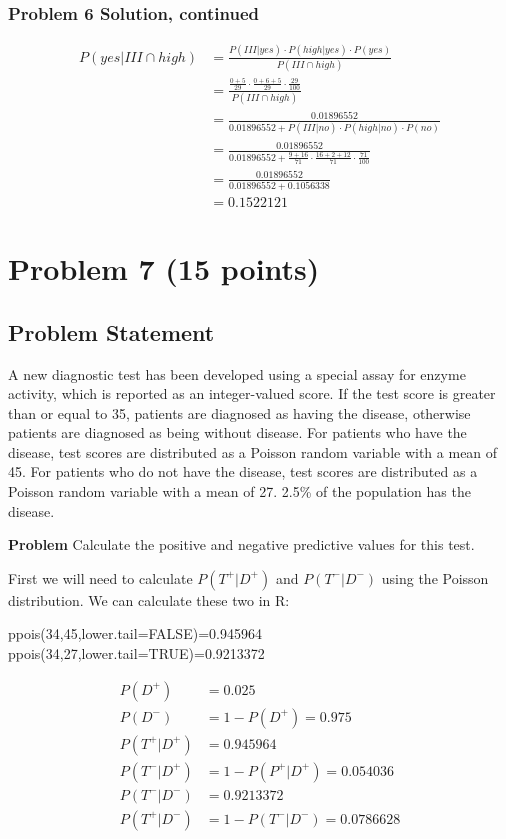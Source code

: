 \documentclass[12pt]{article}
\theoremstyle{definition}
\begin{document}
\subsubsection*{Problem 6 Solution, continued}
\begin{align*}
P(yes|III \cap high) &= \frac{P(III|yes) \cdot P(high|yes) \cdot P(yes)}{P(III \cap high)}\\
&= \frac{\frac{0 + 5}{29} \cdot \frac{0 + 6 + 5}{29} \cdot \frac{29}{100}}{P(III \cap high)}\\
&= \frac{0.01896552}{0.01896552 + P(III|no) \cdot P(high|no) \cdot P(no)}\\
&= \frac{0.01896552}{0.01896552 + \frac{9 + 16}{71} \cdot \frac{16 + 2 + 12}{71} \cdot \frac{71}{100}}\\
&= \frac{0.01896552}{0.01896552+ 0.1056338}\\
&= 0.1522121
\end{align*}







\newpage
\section*{Problem 7 (15 points)}

\subsection*{Problem Statement}

A new diagnostic test has been developed using a special assay for enzyme activity, which is reported as an integer-valued score. If the test score is greater than or equal to 35, patients are diagnosed as having the disease, otherwise patients are diagnosed as being without disease. For patients who have the disease, test scores are distributed as a Poisson random variable with a mean of 45. For patients who do not have the disease, test scores are distributed as a Poisson random variable with a mean of 27. 2.5\% of the population has the disease.

\bigskip
\noindent
{\bf Problem} Calculate the positive and negative predictive values for this test.

First we will need to calculate $P(T^+|D^+)$ and $P(T^-|D^-)$ using the Poisson distribution. We can calculate these two in R:
\begin{verbatim*}
ppois(34,45,lower.tail=FALSE)=0.945964
ppois(34,27,lower.tail=TRUE)=0.9213372
\end{verbatim*}
\begin{align*}
P(D^+) &= 0.025\\
P(D^-) &= 1 - P(D^+) = 0.975\\
P(T^+|D^+) &= 0.945964\\
P(T^-|D^+) &= 1 - P(P^+|D^+) = 0.054036\\
P(T^-|D^-) &= 0.9213372\\
P(T^+|D^-) &= 1 - P(T^-|D^-) = 0.0786628
\end{align*}
\end{document}

